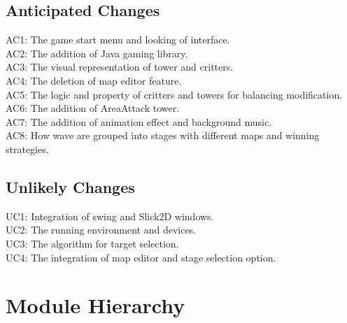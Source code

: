 \documentclass[12,english]{article}
\begin{document}
\subsection{Anticipated Changes}

AC1: The game start menu and looking of interface.\\
AC2: The addition of Java gaming library.\\
AC3: The visual representation of tower and critters.\\
AC4: The deletion of map editor feature.\\
AC5: The logic and property of critters and towers for balancing modification.\\
AC6: The addition of AreaAttack tower.\\
AC7: The addition of animation effect and background music.\\
AC8: How wave are grouped into stages with different maps and winning strategies.\\

\subsection{Unlikely Changes}

UC1: Integration of swing and Slick2D windows.\\
UC2: The running environment and devices.\\
UC3: The algorithm for target selection.\\
UC4: The integration of map editor and stage selection option.

\section{Module Hierarchy}
\end{document}
